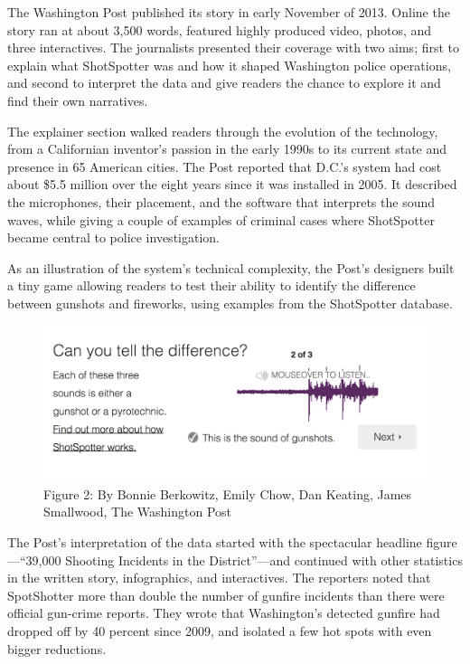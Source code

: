 The Washington Post published its story in early November of 2013. Online
the story ran at about 3,500 words, featured highly produced video, photos,
and three interactives. The journalists presented their coverage with two
aims; first to explain what ShotSpotter was and how it shaped Washington
police operations, and second to interpret the data and give readers the
chance to explore it and find their own narratives.

The explainer section walked readers through the evolution of the technology,
from a Californian inventor's passion in the early 1990s to its current
state and presence in 65 American cities. The Post reported that D.C.'s system
had cost about \$5.5 million over the eight years since it was installed in
2005. It described the microphones, their placement, and the software that
interprets the sound waves, while giving a couple of examples of criminal
cases where ShotSpotter became central to police investigation.

As an illustration of the system's technical complexity, the Post's designers
built a tiny game allowing readers to test their ability to identify the difference
between gunshots and fireworks, using examples from the ShotSpotter
database.

    \begin{figure}
    \includegraphics{images/WaPoGunshotGame.png}
    \caption{Figure 2: By Bonnie Berkowitz, Emily Chow, Dan Keating, James Smallwood, The Washington Post}
    \end{figure}

The Post's interpretation of the data started with the spectacular headline
figure—``39,000 Shooting Incidents in the District''—and continued with
other statistics in the written story, infographics, and interactives. The
reporters noted that SpotShotter more than double the number of gunfire incidents than there were official gun-crime reports. They wrote that Washington's
detected gunfire had dropped off by 40 percent since 2009, and
isolated a few hot spots with even bigger reductions.

